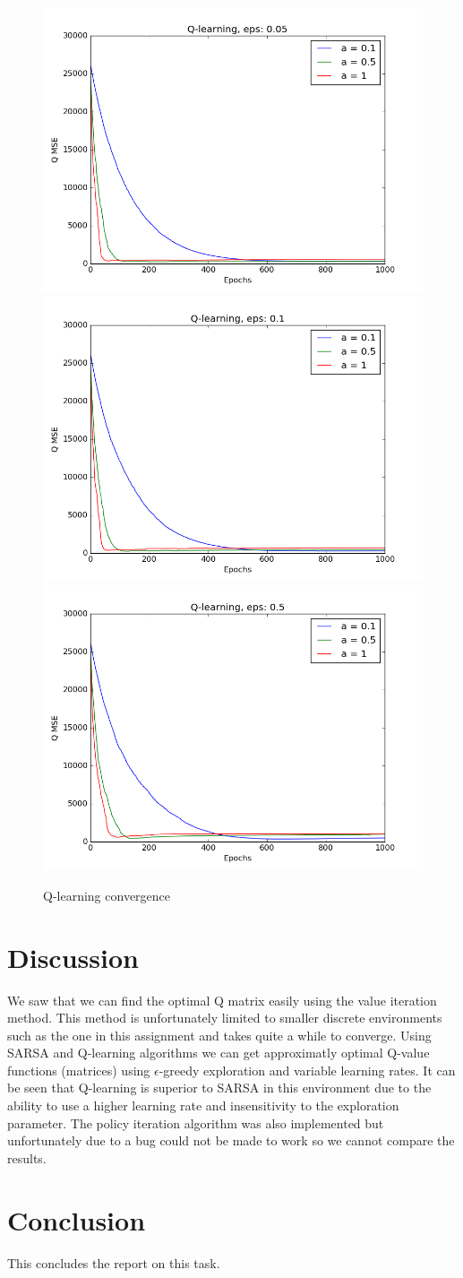 \documentclass[11pt]{article}
\begin{document}
\begin{figure}[htp]

\centering
\includegraphics[width=.33\textwidth]{ql005}\hfill
\includegraphics[width=.33\textwidth]{ql01}\hfill
\includegraphics[width=.33\textwidth]{ql05}

\caption{Q-learning convergence}
\label{fig:figure3}

\end{figure}

\section{Discussion}
We saw that we can find the optimal Q matrix easily using the value iteration method. This method is unfortunately limited to smaller discrete environments such as the one in this assignment and takes quite a while to converge. Using SARSA and Q-learning algorithms we can get approximatly optimal Q-value functions (matrices) using $\epsilon$-greedy exploration and variable learning rates. It can be seen that Q-learning is superior to SARSA in this environment due to the ability to use a higher learning rate and insensitivity to the exploration parameter. The policy iteration algorithm was also implemented but unfortunately due to a bug could not be made to work so we cannot compare the results.

\section{Conclusion}
This concludes the report on this task.
\end{document}
